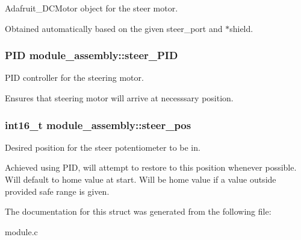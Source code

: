 Adafruit\+\_\+\+D\+C\+Motor object for the steer motor. 

Obtained automatically based on the given steer\+\_\+port and $\ast$shield. \hypertarget{structmodule__assembly_a2c3295e46bdfdacf68245649187688f8}{}
\subsubsection[{steer\+\_\+\+P\+I\+D}]{\setlength{\rightskip}{0pt plus 5cm}P\+I\+D module\+\_\+assembly\+::steer\+\_\+\+P\+I\+D}\label{structmodule__assembly_a2c3295e46bdfdacf68245649187688f8}


P\+I\+D controller for the steering motor. 

Ensures that steering motor will arrive at necesssary position. \hypertarget{structmodule__assembly_ac1ba4918f2a686b77c782e637a191348}{}
\subsubsection[{steer\+\_\+pos}]{\setlength{\rightskip}{0pt plus 5cm}int16\+\_\+t module\+\_\+assembly\+::steer\+\_\+pos}\label{structmodule__assembly_ac1ba4918f2a686b77c782e637a191348}


Desired position for the steer potentiometer to be in. 

Achieved using P\+I\+D, will attempt to restore to this position whenever possible. Will default to home value at start. Will be home value if a value outside provided safe range is given. 

The documentation for this struct was generated from the following file\+:\begin{DoxyCompactItemize}
\item 
module.\+c\end{DoxyCompactItemize}
